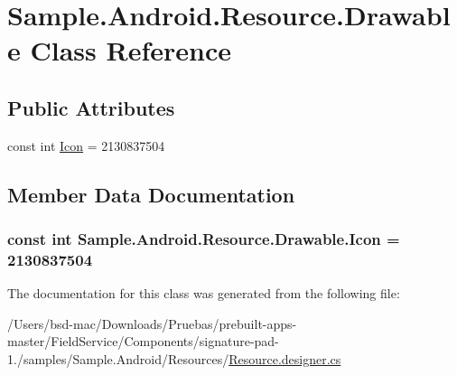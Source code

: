 \hypertarget{class_sample_1_1_android_1_1_resource_1_1_drawable}{\section{Sample.\+Android.\+Resource.\+Drawable Class Reference}
\label{class_sample_1_1_android_1_1_resource_1_1_drawable}
}
\subsection*{Public Attributes}
\begin{DoxyCompactItemize}
\item 
const int \hyperlink{class_sample_1_1_android_1_1_resource_1_1_drawable_a538184896d0746911c2063eec3338104}{Icon} = 2130837504
\end{DoxyCompactItemize}


\subsection{Member Data Documentation}
\hypertarget{class_sample_1_1_android_1_1_resource_1_1_drawable_a538184896d0746911c2063eec3338104}{
\subsubsection[{Icon}]{\setlength{\rightskip}{0pt plus 5cm}const int Sample.\+Android.\+Resource.\+Drawable.\+Icon = 2130837504}}\label{class_sample_1_1_android_1_1_resource_1_1_drawable_a538184896d0746911c2063eec3338104}


The documentation for this class was generated from the following file\+:\begin{DoxyCompactItemize}
\item 
/\+Users/bsd-\/mac/\+Downloads/\+Pruebas/prebuilt-\/apps-\/master/\+Field\+Service/\+Components/signature-\/pad-\/1./samples/\+Sample.\+Android/\+Resources/\hyperlink{_components_2signature-pad-1_82_2samples_2_sample_8_android_2_resources_2_resource_8designer_8cs}{Resource.\+designer.\+cs}\end{DoxyCompactItemize}
